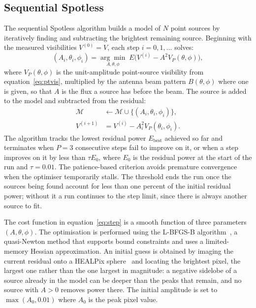 \documentclass[a4paper,11pt]{article}
\begin{document}
\subsection{Sequential Spotless}

The sequential Spotless algorithm builds a model of $N$ point sources by
iteratively finding and subtracting the brightest remaining source.
Beginning with the measured visibilities $V^{(0)} = V$, each step
$i = 0, 1, \dots$ solves:
%
\begin{equation}
	(A_i, \theta_i, \phi_i) =
	\underset{A,\theta,\phi}{\arg\min}\;
	E\bigl(V^{(i)} - A^2 V_P(\theta, \phi)\bigr),
	\label{eq:step}
\end{equation}
%
where $V_P(\theta, \phi)$ is the unit-amplitude point-source visibility
from equation~\eqref{eq:ptvis}, multiplied by the antenna beam pattern
$B(\theta, \phi)$ where one is given, so that $A$ is the flux a source
has before the beam. The source is added to the model and
subtracted from the residual:
%
\begin{align}
	\mathcal{M} & \leftarrow \mathcal{M} \cup \{(A_i, \theta_i, \phi_i)\}, \\
	V^{(i+1)}   & = V^{(i)} - A_i^2 V_P(\theta_i, \phi_i).
\end{align}
%
The algorithm tracks the lowest residual power $E_{\text{best}}$
achieved so far and terminates when $P = 3$ consecutive steps fail
to improve on it, or when a step improves on it by less than
$\tau E_0$, where $E_0$ is the residual power at the start of the
run and $\tau = 0.01$. The patience-based criterion avoids premature
convergence when the optimiser temporarily stalls. The threshold ends
the run once the sources being found account for less than one percent
of the initial residual power; without it a run continues to the step
limit, since there is always another source to fit.

The cost function in equation~\eqref{eq:step} is a smooth function of
three parameters $(A, \theta, \phi)$. The optimisation is performed using
the L-BFGS-B algorithm~\cite{byrd1995}, a quasi-Newton method that
supports bound constraints and uses a limited-memory Hessian
approximation. An initial guess is obtained by imaging the current
residual onto a HEALPix sphere~\cite{gorski2005} and locating the
brightest pixel, the largest one rather than the one largest in
magnitude: a negative sidelobe of a source already in the model can be
deeper than the peaks that remain, and no source with $A > 0$ removes
power there. The initial amplitude is set to $\max(A_0, 0.01)$
where $A_0$ is the peak pixel value.
\end{document}
